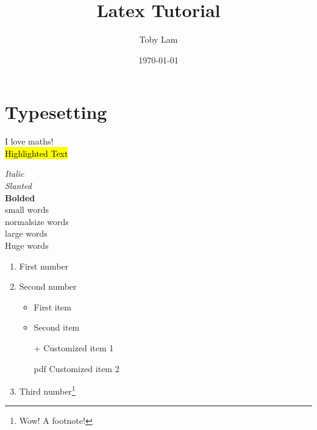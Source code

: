 \documentclass[a4paper]{report}
\begin{document}
\title{\Huge Latex Tutorial}
\author{Toby Lam}
\date{\today}
\maketitle

\tableofcontents

\newpage

\chapter{Typesetting}
\label{interests}

\indent
\indent
I love maths! \\

\noindent
\hl{Highlighted Text}

\noindent
\textit{Italic} \\
\textsl{Slanted} \\
\textbf{Bolded} \\

\noindent
{\small small words} \\
{\normalsize normalsize words} \\
{\large large words} \\

\vspace{2pt}
\noindent
{\huge Huge \hspace{10pt} words} \\

\normalsize

\begin{enumerate}
	\item First number
	\item Second number
	\begin{itemize}
		\item First item
		\item Second item
		\item[+] Customized item 1
		\item[pdf] Customized item 2
	\end{itemize}
	\item Third number\footnote{Wow! A footnote!}
\end{enumerate}
\end{document}
